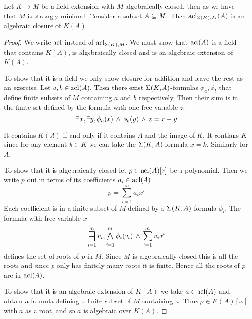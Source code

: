 \begin{prop}
    Let $K \to M$ be a field extension with $M$ algebraically closed, 
    then as  
    we have that $M$ is strongly minimal.
    Consider a subset $A \subseteq M$.
    Then $\operatorname{acl}_{\Sigma(K),M}(A)$ is an algebraic closure of $K(A)$.
\end{prop}
\begin{proof}
    We write $\operatorname{acl}$ instead of $\operatorname{acl}_{\Sigma(K),M}$.
    We must show that $\operatorname{acl}(A)$ is a field that contains $K(A)$, 
    is algebraically closed and is an algebraic extension of 
    $K(A)$.

    To show that it is a field we only show closure for addition and leave
    the rest as an exercise. 
    Let $a, b \in \operatorname{acl}(A)$.
    Then there exist $\Sigma(K,A)$-formulas $\phi_a,\phi_b$ that define 
    finite subsets of $M$ containing $a$ and $b$ respectively.
    Then their sum is in the finite set defined by the formula with one free
    variable $z$:
    \[
        \exists x, \exists y, \phi_a(x) \, \land \, \phi_b(y) \, \land \, z = x + y
    \]

    It contains $K(A)$ if and only if it contains $A$ and the image of $K$.
    It contians $K$ since for any element $k \in K$ we can take the 
    $\Sigma(K,A)$-formula $x = k$. 
    Similarly for $A$.

    To show that it is algebraically closed let 
    $p \in \operatorname{acl}(A)[x]$ be a polynomial.
    Then we write $p$ out in terms of its coefficients $a_i \in \operatorname{acl}(A)$
    \[p = \sum_{i = 1}^m a_i x^i\]
    Each coefficient is in a finite subset of $M$
    defined by a $\Sigma(K,A)$-formula $\phi_i$.
    The formula with free variable $x$
    \[
        \bigexists{i = 1}{m} v_i, \bigand{i = 1}{m} \phi_i(v_i) \AND 
        \sum_{i = 1}^m v_i x^i
    \]
    defines the set of roots of $p$ in $M$.
    Since $M$ is algebraically closed this is all the roots and since
    $p$ only has finitely many roots it is finite.
    Hence all the roots of $p$ are in $\operatorname{acl}(A)$.

    To show that it is an algebraic extension of $K(A)$ we take $a \in \operatorname{acl}(A)$
    and obtain a formula defining a finite subset of $M$ containing $a$.
    Thus 
    $p \in K(A)[x]$ with $a$ as a root, and so $a$ is algebraic over $K(A)$.
\end{proof}

